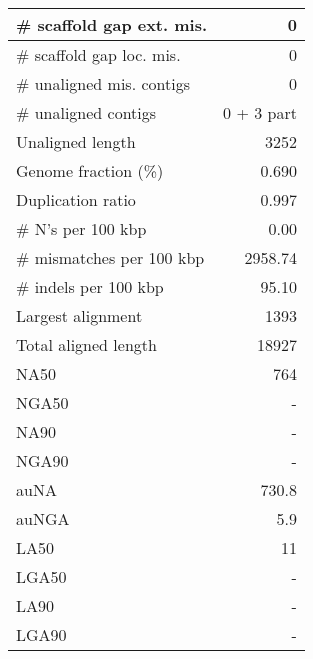 \documentclass[12pt,a4paper]{article}
\begin{document}
\begin{table}[ht]
\begin{center}
\begin{tabular}{|l*{1}{|r}|}
\# scaffold gap ext. mis. & 0 \\ \hline
\# scaffold gap loc. mis. & 0 \\ \hline
\# unaligned mis. contigs & 0 \\ \hline
\# unaligned contigs & 0 + 3 part \\ \hline
Unaligned length & 3252 \\ \hline
Genome fraction (\%) & 0.690 \\ \hline
Duplication ratio & 0.997 \\ \hline
\# N's per 100 kbp & 0.00 \\ \hline
\# mismatches per 100 kbp & 2958.74 \\ \hline
\# indels per 100 kbp & 95.10 \\ \hline
Largest alignment & 1393 \\ \hline
Total aligned length & 18927 \\ \hline
NA50 & 764 \\ \hline
NGA50 & - \\ \hline
NA90 & - \\ \hline
NGA90 & - \\ \hline
auNA & 730.8 \\ \hline
auNGA & 5.9 \\ \hline
LA50 & 11 \\ \hline
LGA50 & - \\ \hline
LA90 & - \\ \hline
LGA90 & - \\ \hline
\end{tabular}
\end{center}
\end{table}
\end{document}
